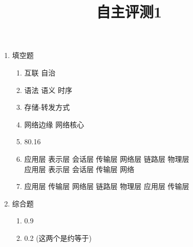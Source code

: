 \documentclass[11pt]{article}
\title{自主评测1}
\date{}
\author{}
\begin{document}
\maketitle

\begin{enumerate}
    \renewcommand{\labelenumi}{\zhnumber{\theenumi}、}
    \renewcommand{\labelenumii}{\arabic{enumii}.}
    \item 填空题 
        \begin{enumerate}
            \item 互联 \quad 自治
            \item 语法 \quad 语义 \quad 时序
            \item 存储-转发方式
            \item 网络边缘 \quad 网络核心
            \item 80.16 
            \item 应用层 \quad 表示层 \quad 会话层 \quad 传输层 \quad 网络层 \quad 链路层 \quad 
                  物理层 \\ 应用层 \quad 表示层 \quad 会话层 \quad 传输层 \quad 网络
            \item 应用层 \quad 传输层 \quad 网络层 \quad 链路层 \quad 物理层 \quad 应用层 \quad 传输层
        \end{enumerate}
    \item 综合题
        \begin{enumerate}
            \item 0.9 
            \item 0.2 (这两个是约等于)
        \end{enumerate}
\end{enumerate}



\end{document}
